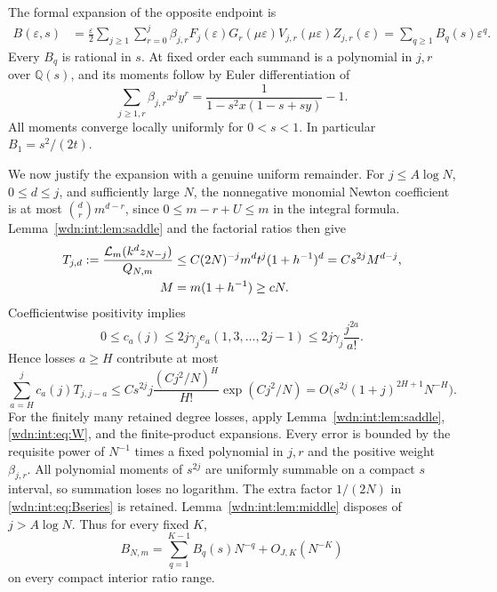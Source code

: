 \documentclass[11pt,letterpaper]{article}
\theoremstyle{remark}\newtheorem{remark}[theorem]{Remark}
\newcommand{\LL}{\mathcal L}
\newcommand{\Q}{\mathbb Q}
\newcommand{\eps}{\varepsilon}
\begin{document}
The formal expansion of the opposite endpoint is
\begin{align}
 B(\eps,s)&=\frac\eps2\sum_{j\ge1}\sum_{r=0}^j
  \beta_{j,r}F_j(\eps)G_r(\mu\eps)V_{j,r}(\mu\eps)Z_{j,r}(\eps)
   =\sum_{q\ge1}B_q(s)\eps^q.\label{wdn:int:eq:Bseries}
\end{align}
Every $B_q$ is rational in $s$. At fixed order each summand is a polynomial
in $j,r$ over $\Q(s)$, and its moments follow by Euler differentiation of
\begin{equation}\label{wdn:int:eq:betasymbol}
 \sum_{j\ge1,r}\beta_{j,r}x^jy^r
       =\frac1{1-s^2x(1-s+sy)}-1.
\end{equation}
All moments converge locally uniformly for $0<s<1$. In particular
$B_1=s^2/(2t)$.

We now justify the expansion with a genuine uniform remainder. For
$j\le A\log N$, $0\le d\le j$, and sufficiently large $N$, the
nonnegative monomial Newton coefficient is at most
$\binom dr m^{d-r}$, since $0\le m-r+U\le m$ in the integral formula.
Lemma~\ref{wdn:int:lem:saddle} and the factorial ratios then give
\begin{align}
 T_{j,d}:=\frac{\LL_m(k^dz_{N-j})}{Q_{N,m}}
 &\le C(2N)^{-j}m^dt^j(1+h^{-1})^d
  =Cs^{2j}M^{d-j},\label{wdn:int:eq:monomialbound}\\
 M&=m(1+h^{-1})\ge cN.\notag
\end{align}
Coefficientwise positivity implies
\[
 0\le c_a(j)\le2j\gamma_j e_a(1,3,\ldots,2j-1)
               \le2j\gamma_j\frac{j^{2a}}{a!}.
\]
Hence losses $a\ge H$ contribute at most
\begin{equation}\label{wdn:int:eq:lossbound}
 \sum_{a=H}^j c_a(j)T_{j,j-a}
 \le Cs^{2j}j\frac{(Cj^2/N)^H}{H!}\exp(Cj^2/N)
 =O\bigl(s^{2j}(1+j)^{2H+1}N^{-H}\bigr).
\end{equation}
For the finitely many retained degree losses, apply
Lemma~\ref{wdn:int:lem:saddle}, \eqref{wdn:int:eq:W}, and the finite-product expansions.
Every error is bounded by the requisite power of $N^{-1}$ times a fixed
polynomial in $j,r$ and the positive weight $\beta_{j,r}$.
All polynomial moments of $s^{2j}$ are uniformly summable on a compact
$s$ interval, so summation loses no logarithm. The extra factor $1/(2N)$
in \eqref{wdn:int:eq:Bseries} is retained. Lemma~\ref{wdn:int:lem:middle} disposes of
$j>A\log N$. Thus for every fixed $K$,
\begin{equation}\label{wdn:int:eq:Bexpansion}
 B_{N,m}=\sum_{q=1}^{K-1}B_q(s)N^{-q}+O_{J,K}(N^{-K})
\end{equation}
on every compact interior ratio range.
\end{document}
